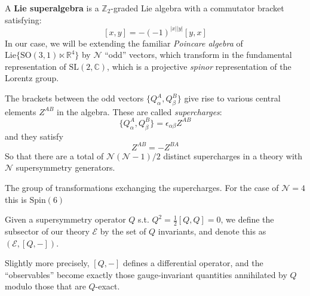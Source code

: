 	\begin{defn}
	A \textbf{Lie superalgebra} is a $\mathbb Z_2$-graded Lie algebra with a commutator bracket satisfying:
		$$[x, y]= -(-1)^{|x||y|} [y, x]$$
		In our case, we will be extending the familiar \emph{Poincare algebra} of $\mathrm{Lie}\{ \mathrm{SO}(3, 1) \ltimes \mathbb R^4  \}$ by $\mathcal N$ ``odd'' vectors, which transform in the fundamental representation of $\mathrm{SL(2, \mathbb C)}$, which is a projective \emph{spinor} representation of the Lorentz group. 
	\end{defn}
	The brackets between the odd vectors $\{Q^A_\alpha, Q^B_\beta \} $ give rise to various central elements $Z^{AB}$ in the algebra. These are called \emph{supercharges}:
	$$\{Q^A_\alpha, Q^B_\beta \} = \epsilon_{\alpha \beta} Z^{AB}$$
	and they satisfy
	$$Z^{AB} = -Z^{BA}$$
	So that there are a total of $\mathcal N (\mathcal N - 1)/2$ distinct supercharges in a theory with $\mathcal N$ supersymmetry generators. 
	\begin{defn}
		The group of transformations exchanging the supercharges. For the case of $\mathcal N = 4$ this is $\mathrm{Spin}(6)$
	\end{defn}
	
	\begin{defn}[Subsector]
		Given a supersymmetry operator $Q$ s.t. $Q^2 = \frac{1}{2} [Q, Q] = 0$, we define the subsector of our theory $\mathcal E$ by the set of $Q$ invariants, and denote this as $(\mathcal E, [Q, -])$.
		
		Slightly more precisely, $[Q, -]$ defines a differential operator, and the ``observables'' become exactly those gauge-invariant quantities annihilated by $Q$ modulo those that are $Q$-exact.
	\end{defn}

	